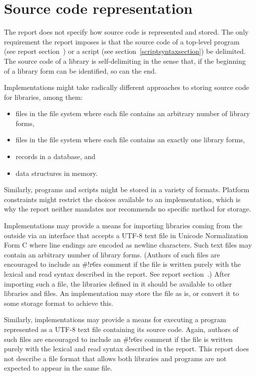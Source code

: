 \chapter{Source code representation}
\label{sourcecoderepappendix}

The report does not specify how source code is represented and stored.
The only requirement the report imposes is that the source code of a
top-level program (see report
section~) or a script (see section~\ref{scriptsyntaxsection}) be
delimited.  The source code of a library is self-delimiting in the
sense that, if the beginning of a library form can be identified, so
can the end.

Implementations might take radically different approaches to storing
source code for libraries, among them:
%
\begin{itemize}
\item files in the file system where each file contains an
  arbitrary number of library forms,
\item files in the file system where each file contains an
  exactly one library forms,
\item records in a database, and
\item data structures in memory.
\end{itemize}
%
Similarly, programs and scripts might be stored in a variety of
formats.  Platform constraints might restrict the choices available to
an implementation, which is why the report neither mandates nor
recommends no specific method for storage.

Implementations may provide a means for importing libraries coming
from the outside via an interface that accepts a UTF-8 text file in
Unicode Normalization Form C where line endings are encoded as newline
characters.  Such text files may contain an arbitrary number of
library forms.  (Authors of such files are encouraged to include an
{\cf\#!r6rs} comment if the file is written purely with the lexical
and read syntax described in the report.  See report
section~.)  After importing such a file, the libraries defined in
it should be available to other libraries and files.  An
implementation may store the file as is, or convert it to some storage
format to achieve this.

Similarly, implementations may provide a means for executing a program
represented as a UTF-8 text file containing its source code.  Again,
authors of such files are encouraged to include an {\cf\#!r6rs}
comment if the file is written purely with the lexical and read syntax
described in the report.  This report does not describe a file format
that allows both libraries and programs are not expected to appear in
the same file.

